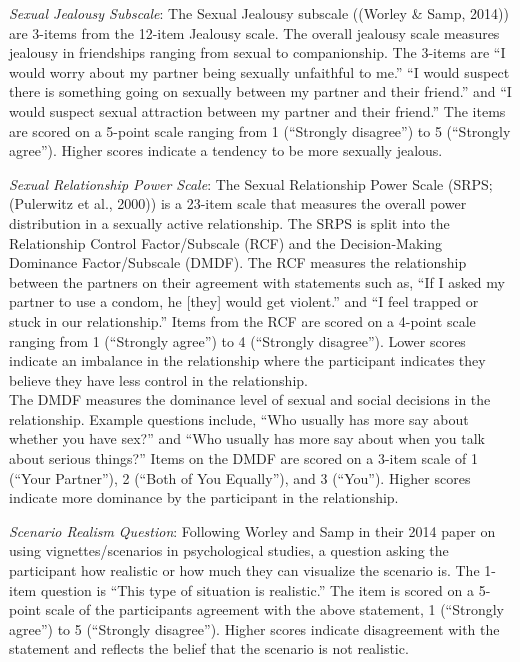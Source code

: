 \documentclass[
  english,
  a4paper]{apa7}
\begin{document}
\emph{Sexual Jealousy Subscale}:
The Sexual Jealousy subscale ((Worley \& Samp, 2014)) are 3-items from the 12-item Jealousy scale. The overall jealousy scale measures jealousy in friendships ranging from sexual to companionship. The 3-items are ``I would worry about my partner being sexually unfaithful to me.'' ``I would suspect there is something going on sexually between my partner and their friend.'' and ``I would suspect sexual attraction between my partner and their friend.'' The items are scored on a 5-point scale ranging from 1 (``Strongly disagree'') to 5 (``Strongly agree''). Higher scores indicate a tendency to be more sexually jealous.

\emph{Sexual Relationship Power Scale}:
The Sexual Relationship Power Scale (SRPS; (Pulerwitz et al., 2000)) is a 23-item scale that measures the overall power distribution in a sexually active relationship. The SRPS is split into the Relationship Control Factor/Subscale (RCF) and the Decision-Making Dominance Factor/Subscale (DMDF). The RCF measures the relationship between the partners on their agreement with statements such as, ``If I asked my partner to use a condom, he {[}they{]} would get violent.'' and ``I feel trapped or stuck in our relationship.'' Items from the RCF are scored on a 4-point scale ranging from 1 (``Strongly agree'') to 4 (``Strongly disagree''). Lower scores indicate an imbalance in the relationship where the participant indicates they believe they have less control in the relationship.\\
The DMDF measures the dominance level of sexual and social decisions in the relationship. Example questions include, ``Who usually has more say about whether you have sex?'' and ``Who usually has more say about when you talk about serious things?'' Items on the DMDF are scored on a 3-item scale of 1 (``Your Partner''), 2 (``Both of You Equally''), and 3 (``You''). Higher scores indicate more dominance by the participant in the relationship.

\emph{Scenario Realism Question}:
Following Worley and Samp in their 2014 paper on using vignettes/scenarios in psychological studies, a question asking the participant how realistic or how much they can visualize the scenario is. The 1-item question is ``This type of situation is realistic.'' The item is scored on a 5-point scale of the participants agreement with the above statement, 1 (``Strongly agree'') to 5 (``Strongly disagree''). Higher scores indicate disagreement with the statement and reflects the belief that the scenario is not realistic.
\end{document}
